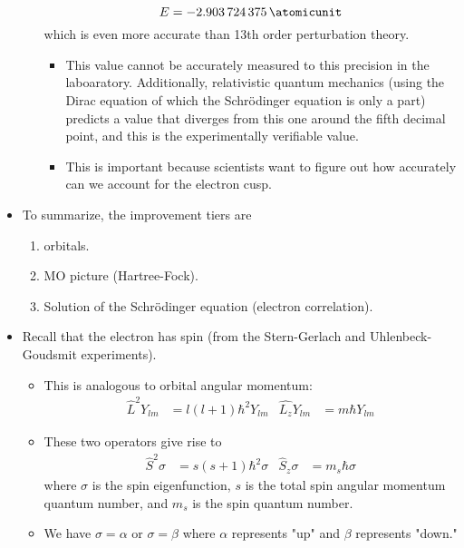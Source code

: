 \documentclass[../notes.tex]{subfiles}
\begin{document}
\begin{itemize}
\begin{itemize}
        \begin{equation*}
            E = \SI{-2.903724375}{\atomicunit}
        \end{equation*}
        which is even more accurate than 13th order perturbation theory.
        \begin{itemize}
            \item This value cannot be accurately measured to this precision in the laboaratory. Additionally, relativistic quantum mechanics (using the Dirac equation of which the Schr\"{o}dinger equation is only a part) predicts a value that diverges from this one around the fifth decimal point, and this is the experimentally verifiable value.
            \item This is important because scientists want to figure out how accurately can we account for the electron cusp.
        \end{itemize}
    \end{itemize}
    \item To summarize, the improvement tiers are
    \begin{enumerate}
        \item {} orbitals.
        \item MO picture (Hartree-Fock).
        \item Solution of the Schr\"{o}dinger equation (electron correlation).
    \end{enumerate}
    \item Recall that the electron has spin (from the Stern-Gerlach and Uhlenbeck-Goudsmit experiments).
    \begin{itemize}
        \item This is analogous to orbital angular momentum:
        \begin{align*}
            \hat{L}^2Y_{lm} &= l(l+1)\hbar^2Y_{lm}&
            \hat{L_z}Y_{lm} &= m\hbar Y_{lm}
        \end{align*}
        \item These two operators give rise to
        \begin{align*}
            \hat{S}^2\sigma &= s(s+1)\hbar^2\sigma&
            \hat{S}_z\sigma &= m_s\hbar\sigma
        \end{align*}
        where $\sigma$ is the spin eigenfunction, $s$ is the total spin angular momentum quantum number, and $m_s$ is the spin quantum number.
        \item We have $\sigma=\alpha$ or $\sigma=\beta$ where $\alpha$ represents "up" and $\beta$ represents "down."

\end{itemize}
\end{itemize}
\end{document}
